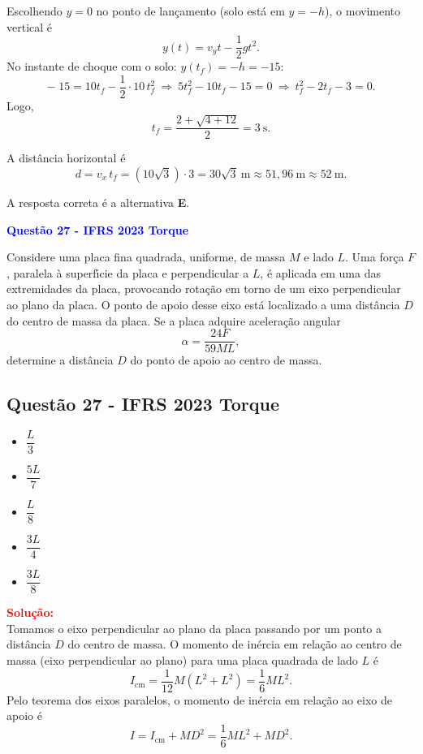 \begin{flushleft}
Escolhendo $y=0$ no ponto de lançamento (solo está em $y=-h$), o movimento vertical é
\[
y(t)=v_y t-\frac{1}{2}gt^2.
\]
No instante de choque com o solo: $y(t_f)=-h=-15$:
\[
-\;15=10t_f-\frac{1}{2}\cdot 10\,t_f^2
\ \Longrightarrow\ 
5t_f^2-10t_f-15=0
\ \Longrightarrow\ 
t_f^2-2t_f-3=0.
\]
Logo,
\[
t_f=\frac{2+\sqrt{4+12}}{2}=3\ \text{s}.
\]

A distância horizontal é
\[
d=v_x\,t_f=(10\sqrt{3})\cdot 3=30\sqrt{3}\ \text{m}\approx 51{,}96\ \text{m}\approx 52\ \text{m}.
\]

\medskip
A resposta correta é a alternativa \colorbox{green!50}{\textbf{E}}.

\end{flushleft}

\begin{flushleft}
\textbf{\textcolor{blue}{\Large Quest\~ao 27 - IFRS 2023 Torque}}\\
\noindent

Considere uma placa fina quadrada, uniforme, de massa $M$ e lado $L$. Uma for\c{c}a $F$, paralela \`a superf\'{\i}cie da placa e perpendicular a $L$, \'e aplicada em uma das extremidades da placa, provocando rota\c{c}\~ao em torno de um eixo perpendicular ao plano da placa. O ponto de apoio desse eixo est\'a localizado a uma dist\^ancia $D$ do centro de massa da placa. Se a placa adquire acelera\c{c}\~ao angular
\[
\alpha=\frac{24F}{59ML},
\]
determine a dist\^ancia $D$ do ponto de apoio ao centro de massa.

\subsection{Quest\~ao 27 - IFRS 2023 Torque}

\begin{itemize}
\item[(A)] \(\dfrac{L}{3}\)
\item[(B)] \(\dfrac{5L}{7}\)
\item[(C)] \(\dfrac{L}{8}\)
\item[(D)] \(\dfrac{3L}{4}\)
\item[(E)] \(\dfrac{3L}{8}\)
\end{itemize}

\vspace{0.5cm}

\textcolor{red}{\textbf{Solu\c{c}\~ao:}}\\

Tomamos o eixo perpendicular ao plano da placa passando por um ponto a dist\^ancia $D$ do centro de massa. O momento de in\'ercia em rela\c{c}\~ao ao centro de massa (eixo perpendicular ao plano) para uma placa quadrada de lado $L$ \'e
\[
I_{\text{cm}}=\frac{1}{12}M(L^2+L^2)=\frac{1}{6}ML^2.
\]
Pelo teorema dos eixos paralelos, o momento de in\'ercia em rela\c{c}\~ao ao eixo de apoio \'e
\[
I=I_{\text{cm}}+MD^2=\frac{1}{6}ML^2+MD^2.
\]


\end{flushleft}
